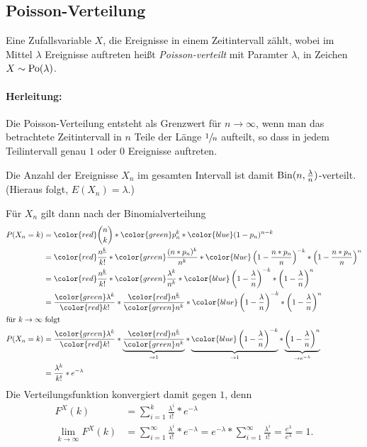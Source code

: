\subsection{Poisson-Verteilung}
Eine Zufallsvariable $X$, die Ereignisse in einem Zeitintervall zählt, wobei im Mittel $\lambda$ Ereignisse auftreten heißt \emph{Poisson-verteilt} mit Paramter $\lambda$, in Zeichen $X\sim \operatorname{Po}(\lambda)$.

\paragraph{Herleitung:}
Die Poisson-Verteilung entsteht als Grenzwert für $n\to\infty$, wenn man das betrachtete Zeitintervall in $n$ Teile der Länge $\sfrac1n$ aufteilt, so dass in jedem Teilintervall genau $1$ oder $0$ Ereignisse auftreten. 

Die Anzahl der Ereignisse $X_n$ im gesamten Intervall ist damit $\operatorname{Bin}(n,\frac\lambda n)$-verteilt. (Hieraus folgt, $E(X_n)=\lambda$.)

Für $X_n$ gilt dann nach der Binomialverteilung
\begin{align*}
	P(X_n=k)&={\color{red}\binom nk}* {\color{green}p_n^k}*{\color{blue}(1-p_n)^{n-k}}\\
	&={\color{red}\frac{n^{\underline k}}{k!}}*{\color{green}\frac{(n*p_n)^k}{n^k}}*{\color{blue}\left(1-\frac{n*p_n}{n}\right)^{-k}*\left(1-\frac{n*p_n}{n}\right)^n}\\
	&={\color{red}\frac{n^{\underline k}}{k!}}*{\color{green}\frac{\lambda^k}{n^k}}*{\color{blue}\left(1-\frac{\lambda}{n}\right)^{-k}*\left(1-\frac{\lambda}{n}\right)^n}\\
	&=\frac{\color{green}\lambda^k}{\color{red}k!}*\frac{\color{red}n^{\underline k}}{\color{green}n^k}*{\color{blue}\left(1-\frac{\lambda}{n}\right)^{-k}*\left(1-\frac{\lambda}{n}\right)^n}\\
\intertext{für $k\to\infty$ folgt}
P(X_n=k)&=\frac{\color{green}\lambda^k}{\color{red}k!}
	*\underbrace{\frac{\color{red}n^{\underline k}}{\color{green}n^k}}_{\to1}
	*\underbrace{\color{blue}\left(1-\frac{\lambda}{n}\right)^{-k}}_{\to1}
	*\underbrace{\left(1-\frac{\lambda}{n}\right)^n}_{\to e^{-\lambda}}\\
	&=\frac{\lambda^k}{k!}*e^{-\lambda}
\end{align*}
Die Verteilungsfunktion konvergiert damit gegen $1$, denn
\begin{align*}
	F^X(k)&=\sum_{i=1}^k \frac{\lambda^i}{i!}*e^{-\lambda}\\
	\lim_{k\to\infty} F^X(k)&=\sum_{i=1}^\infty \frac{\lambda^i}{i!}*e^{-\lambda}
	=e^{-\lambda}*\sum_{i=1}^\infty \frac{\lambda^i}{i!}
	=\frac{e^{\lambda}}{e^{\lambda}}=1.
\end{align*}


